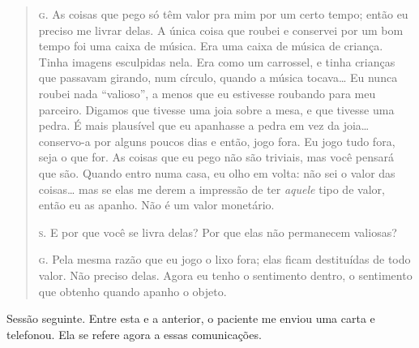 \begin{quote}

\noindent\hskip0mm\textsc{g.} As coisas que pego só têm valor pra mim por um certo tempo; então eu
preciso me livrar delas. A única coisa que roubei e conservei por um
bom tempo foi uma caixa de música. Era uma caixa de música de criança.
Tinha imagens esculpidas nela. Era como um carrossel, e tinha crianças
que passavam girando, num círculo, quando a música tocava\ldots{} Eu nunca
roubei nada ``valioso'', a menos que eu
estivesse roubando para meu parceiro. Digamos que tivesse uma joia
sobre a mesa, e que tivesse uma pedra. É mais plausível que eu
apanhasse a pedra em vez da joia\ldots{} conservo-a por alguns poucos dias
e então, jogo fora. Eu jogo tudo fora, seja o que for. As coisas que eu
pego não são triviais, mas você pensará que são. Quando entro numa
casa, eu olho em volta: não sei o valor das coisas\ldots{} mas se elas me
derem a impressão de ter \textit{aquele} tipo de valor, então eu as
apanho. Não é um valor monetário.

\noindent\hskip0mm\textsc{s.} E por que você se livra delas? Por que elas não permanecem valiosas?

\noindent\hskip0mm\textsc{g.} Pela mesma razão que eu jogo o lixo fora; elas ficam destituídas de
todo valor. Não preciso delas. Agora eu tenho o sentimento dentro, o
sentimento que obtenho quando apanho o objeto.

\end{quote}

\bigskip

Sessão seguinte. Entre esta e a anterior, o paciente me enviou uma
carta e telefonou. Ela se refere agora a essas comunicações.

\bigskip

